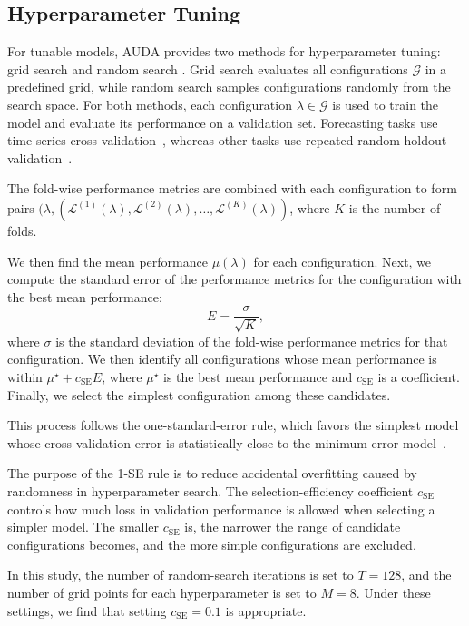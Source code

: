 \subsection{Hyperparameter Tuning}

For tunable models, AUDA provides two methods for hyperparameter tuning: grid search \cite{hastie2009elements} and random search \cite{bergstra2012random}. Grid search evaluates all configurations \(\mathcal{G}\) in a predefined grid, while random search samples configurations randomly from the search space. For both methods, each configuration \(\lambda \in \mathcal{G}\) is used to train the model and evaluate its performance on a validation set. Forecasting tasks use time-series cross-validation~\cite{hyndman2018forecasting}, whereas other tasks use repeated random holdout validation~\cite{kohavi1995study}.

The fold-wise performance metrics are combined with each configuration to form pairs \((\lambda, (\mathcal{L}^{(1)}(\lambda), \mathcal{L}^{(2)}(\lambda), \dots, \mathcal{L}^{(K)}(\lambda))\), where \(K\) is the number of folds.

We then find the mean performance \(\mu(\lambda)\) for each configuration. Next, we compute the standard error of the performance metrics for the configuration with the best mean performance:
\[
	E = \frac{\sigma}{\sqrt{K}},
\]
where \(\sigma\) is the standard deviation of the fold-wise performance metrics for that configuration. We then identify all configurations whose mean performance is within \(\mu^\star + c_{\mathrm{SE}} E\), where \(\mu^\star\) is the best mean performance and \(c_{\mathrm{SE}}\) is a coefficient. Finally, we select the simplest configuration among these candidates.

This process follows the one-standard-error rule, which favors the simplest model whose cross-validation error is statistically close to the minimum-error model~\cite{breiman2017classification}.

The purpose of the 1-SE rule is to reduce accidental overfitting caused by randomness in hyperparameter search. The selection-efficiency coefficient \(c_{\mathrm{SE}}\) controls how much loss in validation performance is allowed when selecting a simpler model. The smaller \(c_{\mathrm{SE}}\) is, the narrower the range of candidate configurations becomes, and the more simple configurations are excluded.

In this study, the number of random-search iterations is set to \(T = 128\), and the number of grid points for each hyperparameter is set to \(M = 8\). Under these settings, we find that setting \(c_{\mathrm{SE}} = 0.1\) is appropriate.

